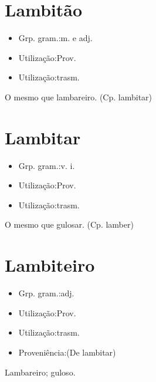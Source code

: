 \section{Lambitão}
\begin{itemize}
\item {Grp. gram.:m.  e  adj.}
\end{itemize}
\begin{itemize}
\item {Utilização:Prov.}
\end{itemize}
\begin{itemize}
\item {Utilização:trasm.}
\end{itemize}
O mesmo que \textunderscore lambareiro\textunderscore .
(Cp. \textunderscore lambitar\textunderscore )
\section{Lambitar}
\begin{itemize}
\item {Grp. gram.:v. i.}
\end{itemize}
\begin{itemize}
\item {Utilização:Prov.}
\end{itemize}
\begin{itemize}
\item {Utilização:trasm.}
\end{itemize}
O mesmo que \textunderscore gulosar\textunderscore .
(Cp. \textunderscore lamber\textunderscore )
\section{Lambiteiro}
\begin{itemize}
\item {Grp. gram.:adj.}
\end{itemize}
\begin{itemize}
\item {Utilização:Prov.}
\end{itemize}
\begin{itemize}
\item {Utilização:trasm.}
\end{itemize}
\begin{itemize}
\item {Proveniência:(De \textunderscore lambitar\textunderscore )}
\end{itemize}
Lambareiro; guloso.
